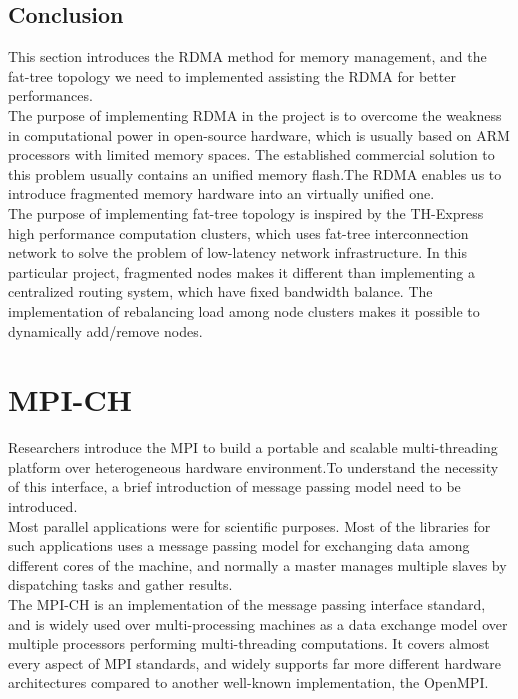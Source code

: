 \documentclass[11pt,openright,a4paper]{report}
\begin{document}
\subsection{Conclusion}
This section introduces the RDMA method for memory management, and the fat-tree topology we need to implemented assisting the RDMA for better performances.\\
The purpose of implementing RDMA in the project is to overcome the weakness in computational power in open-source hardware, which is usually based on ARM processors with limited memory spaces. The established commercial solution to this problem usually contains an unified memory flash.The RDMA enables us to introduce fragmented memory hardware into an virtually unified one. \\
The purpose of implementing fat-tree topology is inspired by the TH-Express high performance computation clusters, which uses fat-tree interconnection network to solve the problem of low-latency network infrastructure\cite{pang2014th}. In this particular project, fragmented nodes makes it different than implementing a centralized routing system, which have fixed bandwidth balance. The implementation of rebalancing load among node clusters makes it possible to dynamically add/remove nodes.\\
\newpage
\section{MPI-CH}
Researchers introduce the MPI to build a portable and scalable multi-threading platform over heterogeneous hardware environment\cite{dongarra1995introduction}.To understand the necessity of this interface, a brief introduction of message passing model need to be introduced.\\
Most parallel applications were for scientific purposes\cite{kendall_2016}. Most of the libraries for such applications uses a message passing model for exchanging data among different cores of the machine, and normally a master manages multiple slaves by dispatching tasks and gather results.\\
The MPI-CH is an implementation of the message passing interface standard, and is widely used over multi-processing machines as a data exchange model over multiple processors performing multi-threading computations. It covers almost every aspect of MPI standards, and widely supports far more different hardware architectures compared to another well-known implementation, the OpenMPI.\\
\end{document}
